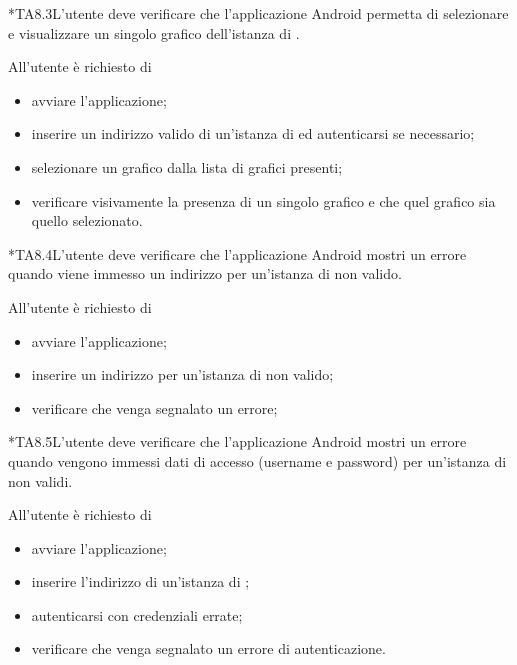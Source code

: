 	*{TA8.3}L'utente deve verificare che l'applicazione Android permetta di selezionare e visualizzare un singolo grafico dell'istanza di \projectname{}.

		All'utente è richiesto di
		\begin{itemize}
			\item avviare l'applicazione;
			\item inserire un indirizzo valido di un'istanza di \projectname{} ed autenticarsi se necessario;
			\item selezionare un grafico dalla lista di grafici presenti;
			\item verificare visivamente la presenza di un singolo grafico e che quel grafico sia quello selezionato.
		\end{itemize}

	*{TA8.4}L'utente deve verificare che l'applicazione Android mostri un errore quando viene immesso un indirizzo per un'istanza di \projectname{} non valido.

		All'utente è richiesto di
		\begin{itemize}
			\item avviare l'applicazione;
			\item inserire un indirizzo per un'istanza di \projectname{} non valido;
			\item verificare che venga segnalato un errore;
		\end{itemize}

	*{TA8.5}L'utente deve verificare che l'applicazione Android mostri un errore quando vengono immessi dati di accesso (username e password) per un'istanza di \projectname{} non validi.

		All'utente è richiesto di
		\begin{itemize}
			\item avviare l'applicazione;
			\item inserire l'indirizzo di un'istanza di \projectname{};
			\item autenticarsi con credenziali errate;
			\item verificare che venga segnalato un errore di autenticazione.
		\end{itemize}
